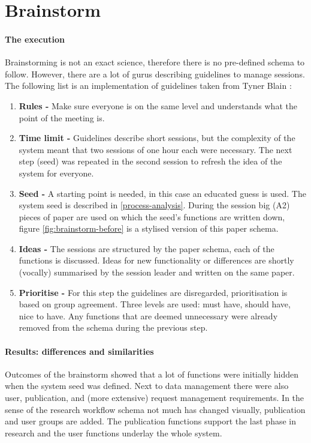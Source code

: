 \section{Brainstorm}
\label{brainstorm}

\paragraph{The execution}
Brainstorming is not an exact science, therefore there is no pre-defined schema to follow.
However, there are a lot of gurus describing guidelines to manage sessions.
The following list is an implementation of guidelines taken from Tyner Blain \cite{brainstormWebsite}:

\begin{enumerate}
	\item \textbf{Rules -} Make sure everyone is on the same level and understands what the point of the meeting is.
	\item \textbf{Time limit -} Guidelines describe short sessions, but the complexity of the system meant that two sessions of one hour each were necessary.
		The next step (seed) was repeated in the second session to refresh the idea of the system for everyone.
	\item \textbf{Seed -} A starting point is needed, in this case an educated guess is used.
		The system seed is described in \ref{process-analysis}.
		During the session big (A2) pieces of paper are used on which the seed's functions are written down, figure \ref{fig:brainstorm-before} is a stylised version of this paper schema.
	\item \textbf{Ideas -} The sessions are structured by the paper schema, each of the functions is discussed.
		Ideas for new functionality or differences are shortly (vocally) summarised by the session leader and written on the same paper.
	\item \textbf{Prioritise -} For this step the guidelines are disregarded, prioritisation is based on group agreement.
		Three levels are used: must have, should have, nice to have.
		Any functions that are deemed unnecessary were already removed from the schema during the previous step.
\end{enumerate}

\paragraph{Results: differences and similarities}
Outcomes of the brainstorm showed that a lot of functions were initially hidden when the system seed was defined.
Next to data management there were also user, publication, and (more extensive) request management requirements.
In the sense of the research workflow schema not much has changed visually, publication and user groups are added.
The publication functions support the last phase in research and the user functions underlay the whole system.

